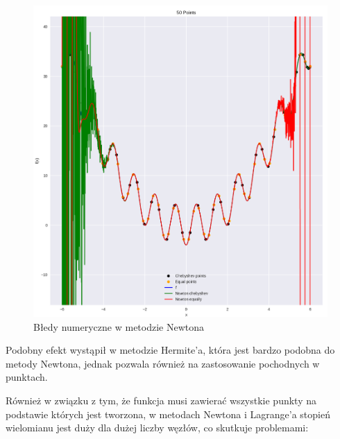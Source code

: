 \documentclass{article}
\begin{document}
\begin{figure}[H]
    \centering
    \includegraphics[width=\textwidth]{img/newt_50.png}
    \caption{Błedy numeryczne w metodzie Newtona}
\end{figure}

Podobny efekt wystąpił w metodzie Hermite'a, która jest bardzo podobna do metody Newtona, jednak pozwala również na zastosowanie
pochodnych w punktach.

Również w związku z tym, że funkcja musi zawierać wszystkie punkty na podstawie których jest tworzona, w metodach Newtona i 
Lagrange'a stopień wielomianu jest duży dla dużej liczby węzłów, co skutkuje problemami: 
\end{document}
